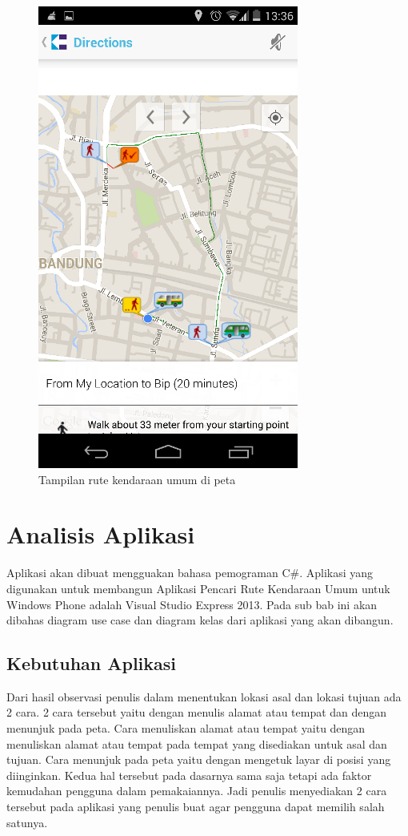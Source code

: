 \begin{figure}[h]
	\centering
		\includegraphics[scale=0.5]{Gambar/KIRI_Android/tampilan_peta}
	\caption{Tampilan rute kendaraan umum di peta}
	\label{fig:peta}
\end{figure}

\clearpage

\section{Analisis Aplikasi}
\label{lab:Analisis Aplikasi}
\hspace{0.5cm} Aplikasi akan dibuat mengguakan bahasa pemograman C\#. Aplikasi yang digunakan untuk membangun Aplikasi Pencari Rute Kendaraan Umum untuk Windows Phone adalah Visual Studio Express 2013. Pada sub bab ini akan dibahas diagram use case dan diagram kelas dari aplikasi yang akan dibangun. 

\subsection{Kebutuhan Aplikasi}
\label{lab:Kebutuhan Aplikasi}
\hspace{0.5cm} Dari hasil observasi penulis dalam menentukan lokasi asal dan lokasi tujuan ada 2 cara. 2 cara tersebut yaitu dengan menulis alamat atau tempat dan dengan menunjuk pada peta. Cara menuliskan alamat atau tempat yaitu dengan menuliskan alamat atau tempat pada tempat yang disediakan untuk asal dan tujuan. Cara menunjuk pada peta yaitu dengan mengetuk layar di posisi yang diinginkan. Kedua hal tersebut pada dasarnya sama saja tetapi ada faktor kemudahan pengguna dalam pemakaiannya. Jadi penulis menyediakan 2 cara tersebut pada aplikasi yang penulis buat agar pengguna dapat memilih salah satunya.

